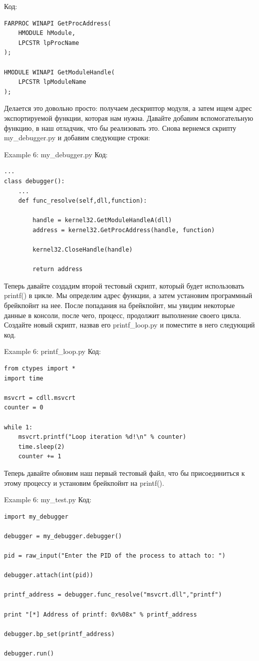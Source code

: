 \documentclass[12pt, a4paper, oneside]{book}
\begin{document}
Код:
\begin{verbatim}
FARPROC WINAPI GetProcAddress(
    HMODULE hModule,
    LPCSTR lpProcName
);

HMODULE WINAPI GetModuleHandle(
    LPCSTR lpModuleName
);
\end{verbatim}

Делается это довольно просто: получаем дескриптор модуля, а затем ищем адрес экспортируемой функции, которая нам нужна. Давайте добавим вспомогательную функцию, в наш отладчик, что бы реализовать это. Снова вернемся скрипту my\_debugger.py и добавим следующие строки:

Example 6: my\_debugger.py
Код:
\begin{verbatim}
...
class debugger():
    ...
    def func_resolve(self,dll,function):

        handle = kernel32.GetModuleHandleA(dll)
        address = kernel32.GetProcAddress(handle, function)

        kernel32.CloseHandle(handle)

        return address
\end{verbatim}

Теперь давайте создадим второй тестовый скрипт, который будет использовать printf() в цикле. Мы определим адрес функции, а затем установим программный брейкпойнт на нее. После попадания на брейкпойнт, мы увидим некоторые данные в консоли, после чего, процесс, продолжит выполнение своего цикла. Создайте новый скрипт, назвав его printf\_loop.py и поместите в него следующий код.

Example 6: printf\_loop.py
Код:
\begin{verbatim}
from ctypes import *
import time

msvcrt = cdll.msvcrt
counter = 0

while 1:
    msvcrt.printf("Loop iteration %d!\n" % counter)
    time.sleep(2)
    counter += 1
\end{verbatim}

Теперь давайте обновим наш первый тестовый файл, что бы присоединиться к этому процессу и установим брейкпойнт на printf().

Example 6: my\_test.py
Код:
\begin{verbatim}
import my_debugger

debugger = my_debugger.debugger()

pid = raw_input("Enter the PID of the process to attach to: ")

debugger.attach(int(pid))

printf_address = debugger.func_resolve("msvcrt.dll","printf")

print "[*] Address of printf: 0x%08x" % printf_address

debugger.bp_set(printf_address)

debugger.run()
\end{verbatim}
\end{document}
